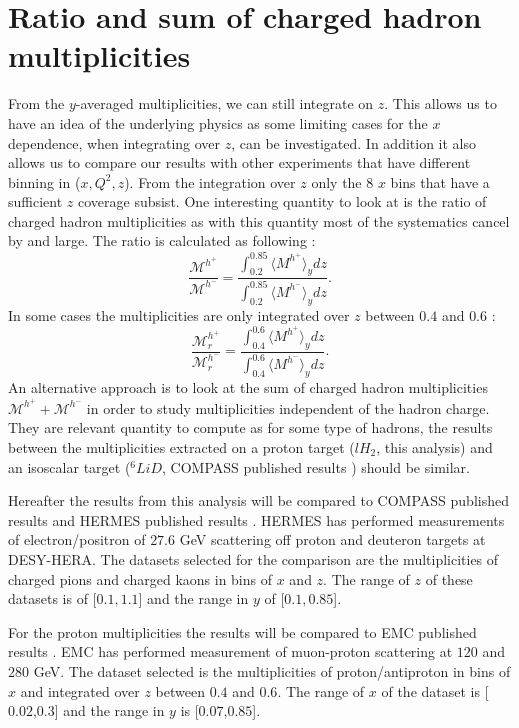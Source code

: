 \section{Ratio and sum of charged hadron multiplicities}

From the $y$-averaged multiplicities, we can still integrate on $z$. This allows us to have an idea of the underlying physics as some limiting cases for the $x$ dependence, when integrating over $z$, can be investigated. In addition it also allows us to compare our results with other experiments that have different binning in ($x,Q^2,z$). From the integration over $z$ only the 8 $x$ bins that have a sufficient $z$ coverage subsist. One interesting quantity to look at is the ratio of charged hadron multiplicities as with this quantity most of the systematics cancel by and large. The ratio is calculated as following :
%
\begin{equation}
  \frac{\mathscr{M}^{h^+}}{\mathscr{M}^{h^-}} = \frac{\int_{0.2}^{0.85} \langle M^{h^+} \rangle_y dz}{\int_{0.2}^{0.85} \langle M^{h^-} \rangle_y dz}.
\end{equation}
%
In some cases the multiplicities are only integrated over $z$ between $0.4$ and $0.6$ :
%
\begin{equation}
  \frac{\mathscr{M}^{h^+}_{r}}{\mathscr{M}^{h^-}_{r}} = \frac{\int_{0.4}^{0.6} \langle M^{h^+} \rangle_y dz}{\int_{0.4}^{0.6} \langle M^{h^-} \rangle_y dz}.
\end{equation}
%
An alternative approach is to look at the sum of charged hadron multiplicities $\mathscr{M}^{h^+}+\mathscr{M}^{h^-}$ in order to study multiplicities independent of the hadron charge. They are relevant quantity to compute as for some type of hadrons, the results between the multiplicities extracted on a proton target ($lH_2$, this analysis) and an isoscalar target ($^6LiD$, COMPASS published results \cite{COMPASS2006Pi,COMPASS2006K}) should be similar.

Hereafter the results from this analysis will be compared to COMPASS published results and HERMES published results \cite{HERMESMult}. HERMES has performed measurements of electron/positron of $27.6$ GeV scattering off proton and deuteron targets at DESY-HERA. The datasets selected for the comparison are the multiplicities of charged pions and charged kaons in bins of $x$ and $z$. The range of $z$ of these datasets is of [$0.1,1.1$] and the range in $y$ of [$0.1,0.85$].

For the proton multiplicities the results will be compared to EMC published results \cite{EMCMult}. EMC has performed measurement of muon-proton scattering at $120$ and $280$ GeV. The dataset selected is the multiplicities of proton/antiproton in bins of $x$ and integrated over $z$ between $0.4$ and $0.6$. The range of $x$ of the dataset is [$0.02$,$0.3$] and the range in $y$ is [$0.07$,$0.85$].


